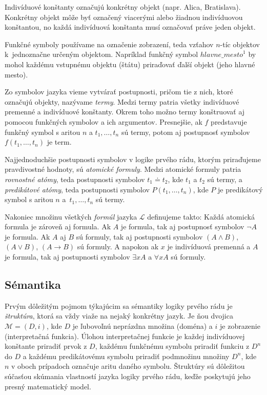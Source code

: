Indivíduové konštanty označujú konkrétny objekt (napr. Alica, Bratislava). Konkrétny objekt môže byť označený viacerými alebo žiadnou indivíduovou konštantou, no každá indivíduová konštanta musí označovať práve jeden objekt.

Funkčné symboly používame na označenie zobrazení, teda vzťahov $n$-tíc objektov k~jednoznačne určeným objektom. Napríklad funkčný symbol ${hlavne\_mesto}^1$ by mohol každému vstupnému objektu (štátu) priraďovať ďalší objekt (jeho hlavné mesto).

Zo symbolov jazyka vieme vytvárať postupnosti, pričom tie z nich, ktoré označujú objekty, nazývame \textit{termy}. Medzi termy patria všetky indivíduové premenné a indivíduové konštanty. Okrem toho možno termy konštruovať aj pomocou funkčných symbolov a ich argumentov. Presnejšie, ak $f$ predstavuje funkčný symbol s aritou $n$ a $t_1, \dots, t_n$ sú termy, potom aj postupnosť symbolov $f(t_1, \dots, t_n)$ je term.

Najjednoduchšie postupnosti symbolov v logike prvého rádu, ktorým priraďujeme pravdivostné hodnoty, sú \textit{atomické formuly}. Medzi atomické formuly patria \textit{rovnostné atómy}, teda postupnosti symbolov $t_1 \doteq t_2$, kde $t_1$ a $t_2$ sú termy, a \textit{predikátové atómy}, teda postupnosti symbolov $P(t_1, \dots, t_n)$, kde $P$ je predikátový symbol s aritou $n$ a~$t_1, \dots, t_n$ sú termy.


Nakoniec množinu všetkých \textit{formúl} jazyka $\mathcal{L}$ definujeme takto: Každá atomická formula je zároveň aj formula. Ak $A$ je formula, tak aj postupnosť symbolov $\neg A$ je formula. Ak $A$ aj $B$ sú formuly, tak aj postupnosti symbolov $(A \land B)$, $(A \lor B)$, $(A \rightarrow B)$ sú formuly. A napokon ak $x$ je indivíduová premenná a $A$ je formula, tak aj postupnosti symbolov $\exists x A$ a $\forall x A$ sú formuly.

\subsection{Sémantika}
Prvým dôležitým pojmom týkajúcim sa sémantiky logiky prvého rádu je \textit{štruktúra}, ktorá sa vždy viaže na nejaký konkrétny jazyk. Je ňou dvojica $\mathcal{M} = (D, i)$, kde $D$ je ľubovoľnú neprázdna množina (doména) a $i$ je zobrazenie (interpretačná funkcia). Úlohou interpretačnej funkcie je každej indivíduovej konštante priradiť prvok z $D$, každému funkčnému symbolu priradiť funkciu z $D^n$ do $D$ a každému predikátovému symbolu priradiť podmnožinu množiny $D^n$, kde $n$ v oboch prípadoch označuje aritu daného symbolu. Štruktúry sú dôležitou súčasťou skúmania vlastností jazyka logiky prvého rádu, keďže poskytujú jeho presný matematický model.

